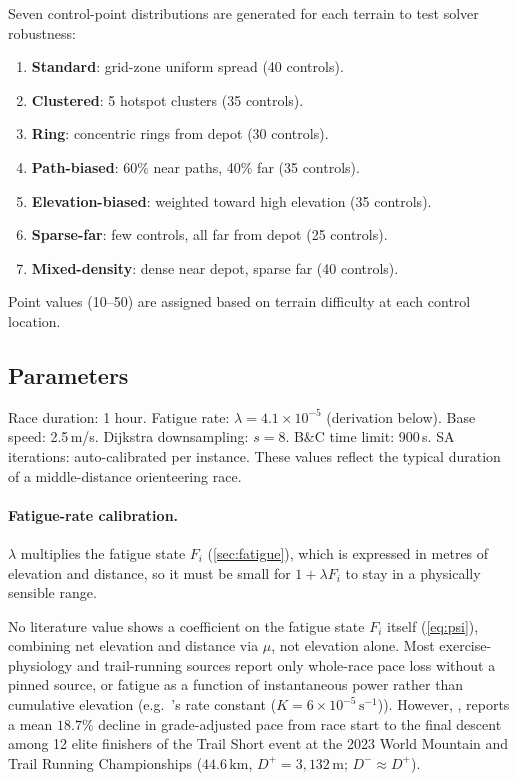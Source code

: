 \documentclass[11pt,a4paper]{article}
\begin{document}
Seven control-point distributions are generated for each terrain to test solver robustness:
\begin{enumerate}[nosep]
  \item \textbf{Standard}: grid-zone uniform spread (40 controls).
  \item \textbf{Clustered}: 5 hotspot clusters (35 controls).
  \item \textbf{Ring}: concentric rings from depot (30 controls).
  \item \textbf{Path-biased}: 60\% near paths, 40\% far (35 controls).
  \item \textbf{Elevation-biased}: weighted toward high elevation (35 controls).
  \item \textbf{Sparse-far}: few controls, all far from depot (25 controls).
  \item \textbf{Mixed-density}: dense near depot, sparse far (40 controls).
\end{enumerate}

Point values (10--50) are assigned based on terrain difficulty at each control location.
\subsection{Parameters}

Race duration: 1 hour.
Fatigue rate: $\lambda = 4.1 \times 10^{-5}$ (derivation below).
Base speed: 2.5\,m/s.
Dijkstra downsampling: $s = 8$.
B\&C time limit: 900\,s.
SA iterations: auto-calibrated per instance.
These values reflect the typical duration of a middle-distance orienteering race.

\paragraph{Fatigue-rate calibration.}
$\lambda$ multiplies the fatigue state $F_i$ (\cref{sec:fatigue}), which is expressed in metres of elevation and distance, so it must be small for $1+\lambda F_i$ to stay in a physically sensible range.

No literature value shows a coefficient on the fatigue state $F_i$ itself (\cref{eq:psi}), combining net elevation and distance via $\mu$, not elevation alone.
Most exercise-physiology and trail-running sources report only whole-race pace loss without a pinned source, or fatigue as a function of instantaneous power rather than cumulative elevation (e.g.\ \citet{jaszczak2024}'s rate constant ($K = 6\times10^{-5}\,\mathrm{s}^{-1}$)).
However, \citet{jaencarrillo2025}, reports a mean $18.7\%$ decline in grade-adjusted pace from race start to the final descent among 12 elite finishers of the Trail Short event at the 2023 World Mountain and Trail Running Championships ($44.6\,\mathrm{km}$, $D^+ = 3{,}132\,\mathrm{m}$; $D^- \approx D^+$).
\end{document}
